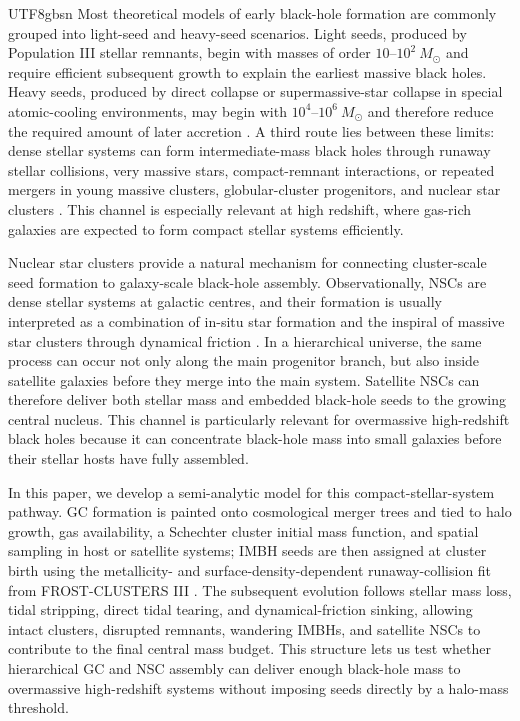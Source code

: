 \documentclass[trackchanges, twocolappendix, twocolumn]{aastex701}
\begin{document}
\begin{CJK*}{UTF8}{gbsn}
Most theoretical models of early black-hole formation are commonly grouped into light-seed and heavy-seed scenarios. Light seeds, produced by Population III stellar remnants, begin with masses of order $10$--$10^2~M_\odot$ and require efficient subsequent growth to explain the earliest massive black holes. Heavy seeds, produced by direct collapse or supermassive-star collapse in special atomic-cooling environments, may begin with $10^4$--$10^6~M_\odot$ and therefore reduce the required amount of later accretion \citep{BrommLoeb2003, Begelman+2006, LodatoNatarajan2006, LatifFerrara2016}. A third route lies between these limits: dense stellar systems can form intermediate-mass black holes through runaway stellar collisions, very massive stars, compact-remnant interactions, or repeated mergers in young massive clusters, globular-cluster progenitors, and nuclear star clusters \citep{PortegiesZwartMcMillan2002, DevecchiVolonteri2009, Davies+2011, Rantala+2026}. This channel is especially relevant at high redshift, where gas-rich galaxies are expected to form compact stellar systems efficiently.

Nuclear star clusters provide a natural mechanism for connecting cluster-scale seed formation to galaxy-scale black-hole assembly. Observationally, NSCs are dense stellar systems at galactic centres, and their formation is usually interpreted as a combination of in-situ star formation and the inspiral of massive star clusters through dynamical friction \citep{Neumayer+2020}. In a hierarchical universe, the same process can occur not only along the main progenitor branch, but also inside satellite galaxies before they merge into the main system. Satellite NSCs can therefore deliver both stellar mass and embedded black-hole seeds to the growing central nucleus. This channel is particularly relevant for overmassive high-redshift black holes because it can concentrate black-hole mass into small galaxies before their stellar hosts have fully assembled.

In this paper, we develop a semi-analytic model for this compact-stellar-system pathway. GC formation is painted onto cosmological merger trees and tied to halo growth, gas availability, a Schechter cluster initial mass function, and spatial sampling in host or satellite systems; IMBH seeds are then assigned at cluster birth using the metallicity- and surface-density-dependent runaway-collision fit from FROST-CLUSTERS III \citep{Rantala+2026}. The subsequent evolution follows stellar mass loss, tidal stripping, direct tidal tearing, and dynamical-friction sinking, allowing intact clusters, disrupted remnants, wandering IMBHs, and satellite NSCs to contribute to the final central mass budget. This structure lets us test whether hierarchical GC and NSC assembly can deliver enough black-hole mass to overmassive high-redshift systems without imposing seeds directly by a halo-mass threshold.


\end{CJK*}
\end{document}
